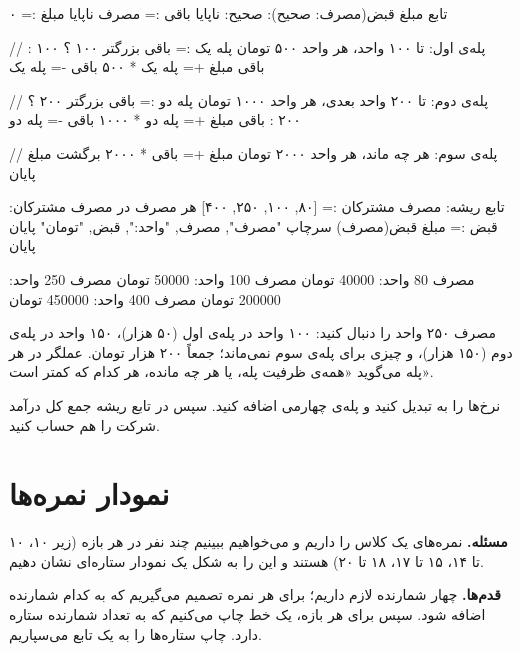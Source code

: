 \begin{salamfa}
تابع مبلغ قبض(مصرف: صحیح): صحیح:
    ناپایا باقی := مصرف
    ناپایا مبلغ := ۰

    // پله‌ی اول: تا ۱۰۰ واحد، هر واحد ۵۰۰ تومان
    پله یک := باقی بزرگتر ۱۰۰ ؟ ۱۰۰ : باقی
    مبلغ += پله یک * ۵۰۰
    باقی -= پله یک

    // پله‌ی دوم: تا ۲۰۰ واحد بعدی، هر واحد ۱۰۰۰ تومان
    پله دو := باقی بزرگتر ۲۰۰ ؟ ۲۰۰ : باقی
    مبلغ += پله دو * ۱۰۰۰
    باقی -= پله دو

    // پله‌ی سوم: هر چه ماند، هر واحد ۲۰۰۰ تومان
    مبلغ += باقی * ۲۰۰۰
    برگشت مبلغ
پایان

تابع ریشه:
    مصرف مشترکان := [۸۰, ۱۰۰, ۲۵۰, ۴۰۰]
    هر مصرف در مصرف مشترکان:
        قبض := مبلغ قبض(مصرف)
        سرچاپ "مصرف", مصرف, "واحد:", قبض, "تومان"
    پایان
پایان
\end{salamfa}

\begin{outputfa}
مصرف 80 واحد: 40000 تومان
مصرف 100 واحد: 50000 تومان
مصرف 250 واحد: 200000 تومان
مصرف 400 واحد: 450000 تومان
\end{outputfa}

مصرف ۲۵۰ واحد را دنبال کنید: ۱۰۰ واحد در پله‌ی اول (۵۰ هزار)، ۱۵۰ واحد در
پله‌ی دوم (۱۵۰ هزار)، و چیزی برای پله‌ی سوم نمی‌ماند؛ جمعاً ۲۰۰ هزار تومان.
عملگر  در هر پله می‌گوید «همه‌ی ظرفیت پله، یا هر چه مانده، هر کدام
که کمتر است».

\begin{tip}
نرخ‌ها را به  تبدیل کنید و پله‌ی چهارمی اضافه کنید. سپس در
تابع ریشه جمع کل درآمد شرکت را هم حساب کنید.
\end{tip}

\section{نمودار نمره‌ها}

\textbf{مسئله.} نمره‌های یک کلاس را داریم و می‌خواهیم ببینیم چند نفر در هر
بازه (زیر ۱۰، ۱۰ تا ۱۴، ۱۵ تا ۱۷، ۱۸ تا ۲۰) هستند و این را به شکل یک
نمودار ستاره‌ای نشان دهیم.

\textbf{قدم‌ها.} چهار شمارنده لازم داریم؛ برای هر نمره تصمیم می‌گیریم که به
کدام شمارنده اضافه شود. سپس برای هر بازه، یک خط چاپ می‌کنیم که به تعداد
شمارنده ستاره دارد. چاپ ستاره‌ها را به یک تابع می‌سپاریم.

